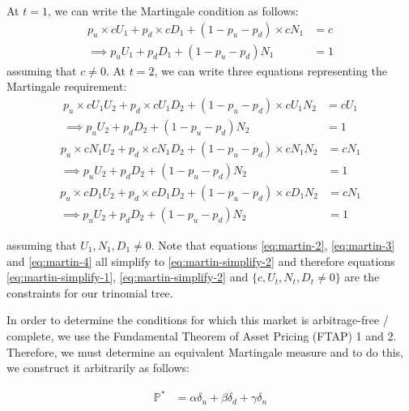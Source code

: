 \documentclass{article}
\begin{document}
At $t=1$, we can write the Martingale condition as follows: 
\begin{align}
    p_u\times cU_1 + p_d\times cD_1 + (1-p_u-p_d)\times cN_1 & = c \label{eq:martin-1} \\
    \implies p_uU_1 + p_dD_1 + (1-p_u-p_d)N_1 & = 1 \label{eq:martin-simplify-1}
\end{align}
assuming that $c\neq0$. At $t=2$, we can write three equations representing the Martingale requirement:
\begin{align}
    p_u\times cU_1U_2 + p_d\times cU_1D_2 + (1-p_u-p_d)\times cU_1N_2 & = cU_1 \label{eq:martin-2} \\
    \implies p_uU_2 + p_dD_2 + (1-p_u-p_d)N_2 & = 1 \label{eq:martin-simplify-2}
\end{align}
\begin{align}
    p_u\times cN_1U_2 + p_d\times cN_1D_2 + (1-p_u-p_d)\times cN_1N_2 & = cN_1 \label{eq:martin-3} \\
    \implies p_uU_2 + p_dD_2 + (1-p_u-p_d)N_2 & = 1 \nonumber
\end{align}
\begin{align}
    p_u\times cD_1U_2 + p_d\times cD_1D_2 + (1-p_u-p_d)\times cD_1N_2 & = cN_1 \label{eq:martin-4} \\
    \implies p_uU_2 + p_dD_2 + (1-p_u-p_d)N_2 & = 1 \nonumber
\end{align}

assuming that $U_1,N_1,D_1\neq0$. Note that equations \ref{eq:martin-2}, \ref{eq:martin-3} and \ref{eq:martin-4} all simplify to \ref{eq:martin-simplify-2} and therefore equations \ref{eq:martin-simplify-1}, \ref{eq:martin-simplify-2} and $\{c,U_t,N_t,D_t\neq0\}$ are the constraints for our trinomial tree. 

In order to determine the conditions for which this market is arbitrage-free / complete, we use the Fundamental Theorem of Asset Pricing (FTAP) 1 and 2. Therefore, we must determine an equivalent Martingale measure and to do this, we construct it arbitrarily as follows:

\begin{align}
    \mathbb{P}^* & = \alpha\delta_u + \beta\delta_d + \gamma\delta_n \label{eq:pstar}
\end{align}
\end{document}
